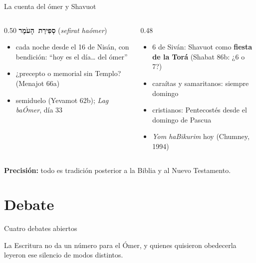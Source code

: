 \documentclass[hyperref={bookmarks=false},aspectratio=169]{beamer}
\newcommand{\heb}[1]{\mbox{\foreignlanguage{hebrew}{#1}}}
\newcommand{\destacar}[1]{\textbf{\textcolor{tierraroja}{#1}}}
\newcommand{\precision}[1]{{\footnotesize\color{sepia}\textbf{Precisión:} #1}}
\begin{document}
\begin{frame}{La cuenta del ómer y Shavuot}
\begin{columns}[t,onlytextwidth]
\begin{column}{0.50\textwidth}\small\RaggedRight
\textbf{\color{tierraroja}\heb{סְפִירַת הָעֹמֶר}} (\emph{sefirat haómer})
\begin{itemize}
\item cada noche desde el 16 de Nisán, con bendición: ``hoy es el día\ldots{} del ómer''
\item ¿precepto o memorial sin Templo? (Menajot 66a)
\item semiduelo (Yevamot 62b); \emph{Lag baÓmer}, día 33
\end{itemize}
\end{column}
\begin{column}{0.48\textwidth}\small\RaggedRight
\begin{itemize}
\item 6 de Siván: Shavuot como \destacar{fiesta de la Torá} (Shabat 86b: ¿6 o 7?)
\item caraítas y samaritanos: siempre domingo
\item cristianos: Pentecostés desde el domingo de Pascua
\item \emph{Yom haBikurim} hoy (Chumney, 1994)
\end{itemize}
\end{column}
\end{columns}\medskip
\precision{todo es tradición posterior a la Biblia y al Nuevo Testamento.}
\end{frame}

\section{Debate}

\begin{frame}{Cuatro debates abiertos}
\centering
{}\par\medskip
\small\RaggedRight La Escritura no da un número para el Ómer, y quienes quisieron obedecerla leyeron ese silencio de modos distintos.
\end{frame}
\end{document}
